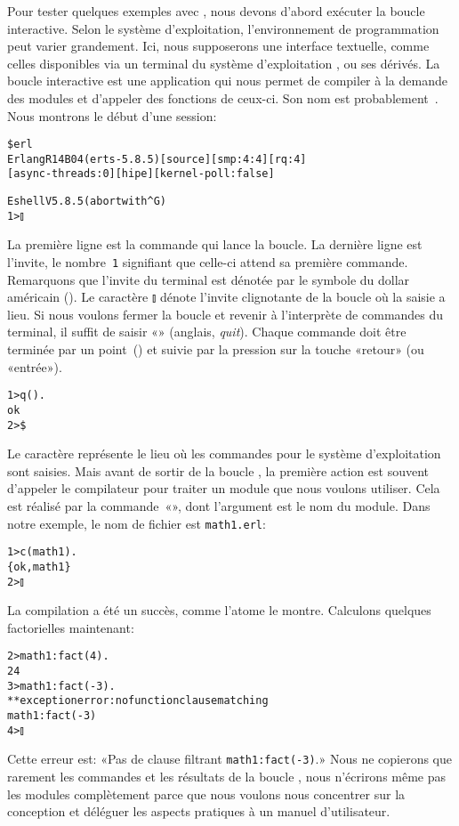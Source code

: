 Pour tester quelques exemples avec , nous devons
d'abord exécuter la boucle interactive. Selon le système
d'exploitation, l'environnement de programmation peut varier
grandement. Ici, nous supposerons une interface textuelle, comme
celles disponibles via un terminal du système d'exploitation \Unix, ou
ses dérivés. La boucle interactive \Erlang est une application qui
nous permet de compiler à la demande des modules et d'appeler des
fonctions de ceux-ci. Son nom est probablement~. Nous
montrons le début d'une session:
\begin{alltt}
\$ erl
Erlang R14B04 (erts-5.8.5) [source] [smp:4:4] [rq:4]
[async-threads:0] [hipe] [kernel-poll:false]

Eshell V5.8.5  (abort with ^G)
1> \(\talloblong\)
\end{alltt}
La première ligne est la commande qui lance la boucle. La dernière
ligne est l'invite, le nombre~\texttt{1} signifiant que celle-ci
attend sa première commande. Remarquons que l'invite du terminal est
dénotée par le symbole du dollar américain (\erlcode{\$}). Le
caractère \(\talloblong\) dénote l'invite clignotante de la boucle
\Erlang où la saisie a lieu. Si nous voulons fermer la boucle et
revenir à l'interprète de commandes du terminal, il suffit de saisir
«» (anglais, \emph{quit}). Chaque commande doit être
terminée par un point~() et suivie par la pression sur la
touche «retour» (ou «entrée»).
\begin{alltt}
1> q().
ok
2> \$ \textvisiblespace
\end{alltt}
Le caractère \erlcode{\textvisiblespace} représente le lieu où les
commandes pour le système d'exploitation sont saisies. Mais avant de
sortir de la boucle \Erlang, la première action est souvent d'appeler
le compilateur \Erlang pour traiter un module que nous voulons
utiliser. Cela est réalisé par la commande~«», dont
l'argument est le nom du module. Dans notre exemple, le nom de fichier
est \texttt{math1.erl}:
\begin{alltt}
1> c(math1).
\{ok,math1\}
2> \(\talloblong\)
\end{alltt}
La compilation a été un succès, comme l'atome  le
montre. Calculons quelques factorielles maintenant:
\begin{alltt}
2> math1:fact(4).
24
3> math1:fact(-3).
** exception error: no function clause matching
math1:fact(-3)
4> \(\talloblong\)
\end{alltt}
Cette erreur est: «Pas de clause filtrant \texttt{math1:fact(-3)}.»
Nous ne copierons que rarement les commandes et les résultats de la
boucle \Erlang, nous n'écrirons même pas les modules complètement
parce que nous voulons nous concentrer sur la conception et déléguer
les aspects pratiques à un manuel d'utilisateur.

